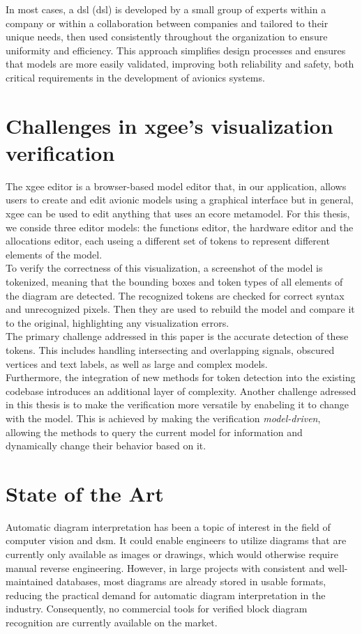 In most cases, a \acrlong{dsl} (\acrshort{dsl}) is developed by a small group of experts within a company or within a collaboration between companies and tailored to their unique needs, then used consistently throughout the organization to ensure uniformity and efficiency. This approach simplifies design processes and ensures that models are more easily validated, improving both reliability and safety, both critical requirements in the development of avionics systems.

\section{Challenges in \acrshort{xgee}'s visualization verification}
\label{sec:challenges_xgee_visualization_verification}
The \acrshort{xgee} editor is a browser-based model editor that, in our application, allows users to create and edit avionic models using a graphical interface but in general, \acrshort{xgee} can be used to edit anything that uses an ecore metamodel. For this thesis, we conside three editor models: the functions editor, the hardware editor and the allocations editor, each useing a different set of tokens to represent different elements of the model.\\
To verify the correctness of this visualization, a screenshot of the model is tokenized, meaning that the bounding boxes and token types of all elements of the diagram are detected. The recognized tokens are checked for correct syntax and unrecognized pixels. Then they are used to rebuild the model and compare it to the original, highlighting any visualization errors.\\
The primary challenge addressed in this paper is the accurate detection of these tokens. This includes handling intersecting and overlapping signals, obscured vertices and text labels, as well as large and complex models.\\
Furthermore, the integration of new methods for token detection into the existing codebase introduces an additional layer of complexity. 
Another challenge adressed in this thesis is to make the verification more versatile by enabeling it to change with the model. This is achieved by making the verification \textit{model-driven}, allowing the methods to query the current model for information and dynamically change their behavior based on it.

\section{State of the Art}
\label{sec:state_of_the_art}
Automatic diagram interpretation has been a topic of interest in the field of computer vision and \acrshort{dsm}. It could enable engineers to utilize diagrams that are currently only available as images or drawings, which would otherwise require manual reverse engineering. However, in large projects with consistent and well-maintained databases, most diagrams are already stored in usable formats, reducing the practical demand for automatic diagram interpretation in the industry. Consequently, no commercial tools for verified block diagram recognition are currently available on the market.

